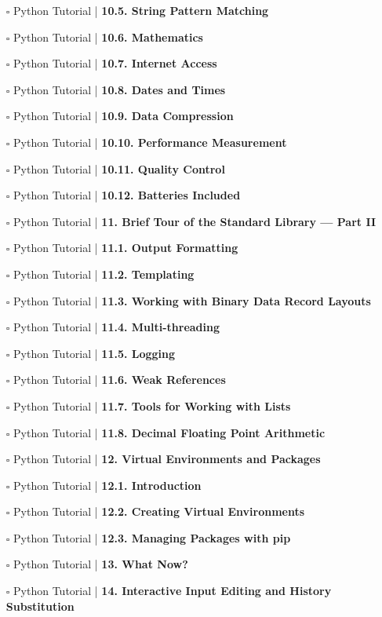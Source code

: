 \documentclass[a4, landscape, 12pt]{article}
\newcommand{\checkbox}{$\square$}%
\begin{document}
\begin{itemize}
{}
\item [\checkbox]  Python Tutorial | \textbf{ 10.5. String Pattern Matching
}
\item [\checkbox]  Python Tutorial | \textbf{ 10.6. Mathematics
}
\item [\checkbox]  Python Tutorial | \textbf{ 10.7. Internet Access
}
\item [\checkbox]  Python Tutorial | \textbf{ 10.8. Dates and Times
}
\item [\checkbox]  Python Tutorial | \textbf{ 10.9. Data Compression
}
\item [\checkbox]  Python Tutorial | \textbf{ 10.10. Performance Measurement
}
\item [\checkbox]  Python Tutorial | \textbf{ 10.11. Quality Control
}
\item [\checkbox]  Python Tutorial | \textbf{ 10.12. Batteries Included
}
\item [\checkbox]  Python Tutorial | \textbf{ 11. Brief Tour of the Standard Library — Part II
}
\item [\checkbox]  Python Tutorial | \textbf{ 11.1. Output Formatting
}
\item [\checkbox]  Python Tutorial | \textbf{ 11.2. Templating
}
\item [\checkbox]  Python Tutorial | \textbf{ 11.3. Working with Binary Data Record Layouts
}
\item [\checkbox]  Python Tutorial | \textbf{ 11.4. Multi-threading
}
\item [\checkbox]  Python Tutorial | \textbf{ 11.5. Logging
}
\item [\checkbox]  Python Tutorial | \textbf{ 11.6. Weak References
}
\item [\checkbox]  Python Tutorial | \textbf{ 11.7. Tools for Working with Lists
}
\item [\checkbox]  Python Tutorial | \textbf{ 11.8. Decimal Floating Point Arithmetic
}
\item [\checkbox]  Python Tutorial | \textbf{ 12. Virtual Environments and Packages
}
\item [\checkbox]  Python Tutorial | \textbf{ 12.1. Introduction
}
\item [\checkbox]  Python Tutorial | \textbf{ 12.2. Creating Virtual Environments
}
\item [\checkbox]  Python Tutorial | \textbf{ 12.3. Managing Packages with pip
}
\item [\checkbox]  Python Tutorial | \textbf{ 13. What Now?
}
\item [\checkbox]  Python Tutorial | \textbf{ 14. Interactive Input Editing and History Substitution
}
\end{itemize}
\end{document}
